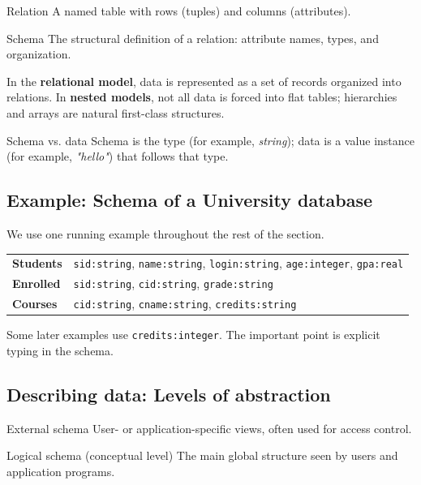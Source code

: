 \documentclass[../../dis.tex]{subfiles}
\begin{document}
\begin{concept}{Relation}\label{def:relation}
A named table with rows (tuples) and columns (attributes).
\end{concept}

\begin{concept}{Schema}\label{def:schema}
The structural definition of a relation: attribute names, types, and organization.
\end{concept}

In the \textbf{relational model}, data is represented as a set of records organized into relations.
In \textbf{nested models}, not all data is forced into flat tables; hierarchies and arrays are natural first-class structures.

\begin{concept}{Schema vs. data}
Schema is the type (for example, \textit{string}); data is a value instance (for example, \textit{"hello"}) that follows that type.
\end{concept}

\subsection{Example: Schema of a University database}
We use one running example throughout the rest of the section.

\begin{tabularx}{\textwidth}{@{}lX@{}}
\textbf{Students} & \texttt{sid:string}, \texttt{name:string}, \texttt{login:string}, \texttt{age:integer}, \texttt{gpa:real} \\
\textbf{Enrolled} & \texttt{sid:string}, \texttt{cid:string}, \texttt{grade:string} \\
\textbf{Courses} & \texttt{cid:string}, \texttt{cname:string}, \texttt{credits:string} \\
\end{tabularx}

Some later examples use \texttt{credits:integer}. The important point is explicit typing in the schema.

\subsection{Describing data: Levels of abstraction}
\begin{concept}{External schema}
User- or application-specific views, often used for access control.
\end{concept}

\begin{concept}{Logical schema (conceptual level)}
The main global structure seen by users and application programs.
\end{concept}
\end{document}
